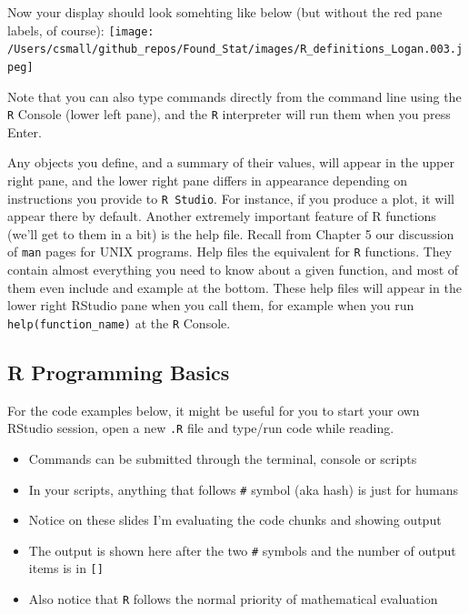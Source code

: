 \documentclass[]{book}
\providecommand{\tightlist}{%
  \setlength{\itemsep}{0pt}\setlength{\parskip}{0pt}}
\begin{document}
Now your display should look somehting like below (but without the red pane labels, of course):
\texttt{[image: /Users/csmall/github\_repos/Found\_Stat/images/R\_definitions\_Logan.003.jpeg]}

Note that you can also type commands directly from the command line using the \texttt{R} Console (lower left pane), and the \texttt{R} interpreter will run them when you press Enter.

Any objects you define, and a summary of their values, will appear in the upper right pane, and the lower right pane differs in appearance depending on instructions you provide to \texttt{R\ Studio}. For instance, if you produce a plot, it will appear there by default. Another extremely important feature of R functions (we'll get to them in a bit) is the help file. Recall from Chapter 5 our discussion of \texttt{man} pages for UNIX programs. Help files the equivalent for \texttt{R} functions. They contain almost everything you need to know about a given function, and most of them even include and example at the bottom. These help files will appear in the lower right RStudio pane when you call them, for example when you run \texttt{help(function\_name)} at the \texttt{R} Console.

\hypertarget{r-programming-basics}{%
\subsection{R Programming Basics}\label{r-programming-basics}}

For the code examples below, it might be useful for you to start your own RStudio session, open a new \texttt{.R} file and type/run code while reading.

\begin{itemize}
\tightlist
\item
  Commands can be submitted through the terminal, console or scripts
\item
  In your scripts, anything that follows \texttt{\#} symbol (aka hash) is just for humans
\item
  Notice on these slides I'm evaluating the code chunks and showing output
\item
  The output is shown here after the two \texttt{\#} symbols and the number of output items is in \texttt{{[}{]}}
\item
  Also notice that \texttt{R} follows the normal priority of mathematical evaluation
\end{itemize}
\end{document}
